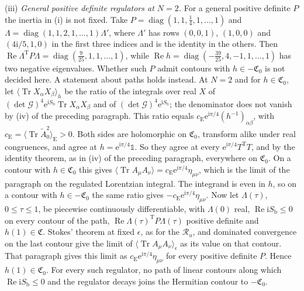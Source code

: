 (iii) \emph{General positive definite regulators at \(N=2\).} For a general positive definite \(P\) the inertia in (i) is not fixed. Take \(P=\operatorname{diag}(1,1,\tfrac14,1,\dots,1)\) and \(\Lambda=\operatorname{diag}(1,1,2,1,\dots,1)\Lambda'\), where \(\Lambda'\) has rows \((0,0,1)\), \((1,0,0)\) and \((4\mathrm i/5,1,0)\) in the first three indices and is the identity in the others. Then \(\operatorname{Re}\Lambda^{\mathrm T}P\Lambda=\operatorname{diag}(\tfrac9{25},1,1,\dots,1)\), while \(\operatorname{Re}h=\operatorname{diag}(-\tfrac{39}{25},4,-1,1,\dots,1)\) has two negative eigenvalues. Whether such \(P\) admit contours with \(h\in-\mathfrak C_0\) is not decided here. A statement about paths holds instead. At \(N=2\) and for \(h\in\mathfrak C_0\), let \(\langle\operatorname{Tr}X_\alpha X_\beta\rangle_h\) be the ratio of the integrals over real \(X\) of \((\det\mathcal G)^4\mathrm e^{\mathrm iS_{\mathrm b}}\operatorname{Tr}X_\alpha X_\beta\) and of \((\det\mathcal G)^4\mathrm e^{\mathrm iS_{\mathrm b}}\); the denominator does not vanish by (iv) of the preceding paragraph. This ratio equals \(c_{\mathrm E}\mathrm e^{\mathrm i\pi/4}(h^{-1})_{\alpha\beta}\), with \(c_{\mathrm E}=\langle\operatorname{Tr}\tilde A_0^2\rangle_{\mathrm E}>0\). Both sides are holomorphic on \(\mathfrak C_0\), transform alike under real congruences, and agree at \(h=\mathrm e^{\mathrm i\pi/4}\mathbb 1\). So they agree at every \(\mathrm e^{\mathrm i\pi/4}T^{\mathrm T}T\), and by the identity theorem, as in (iv) of the preceding paragraph, everywhere on \(\mathfrak C_0\). On a contour with \(h\in\mathfrak C_0\) this gives \(\langle\operatorname{Tr}A_\mu A_\nu\rangle=c_{\mathrm E}\mathrm e^{\mathrm i\pi/4}\eta_{\mu\nu}\), which is the limit of the paragraph on the regulated Lorentzian integral. The integrand is even in \(h\), so on a contour with \(h\in-\mathfrak C_0\) the same ratio gives \(-c_{\mathrm E}\mathrm e^{\mathrm i\pi/4}\eta_{\mu\nu}\). Now let \(\Lambda(\tau)\), \(0\le\tau\le1\), be piecewise continuously differentiable, with \(\Lambda(0)\) real, \(\operatorname{Re}\mathrm iS_{\mathrm b}\le0\) on every contour of the path, \(\operatorname{Re}\Lambda(\tau)^{\mathrm T}P\Lambda(\tau)\) positive definite and \(h(1)\in\mathfrak C\). Stokes' theorem at fixed \(\epsilon\), as for the \(\mathcal R_u\), and dominated convergence on the last contour give the limit of \(\langle\operatorname{Tr}A_\mu A_\nu\rangle_\epsilon\) as its value on that contour. That paragraph gives this limit as \(c_{\mathrm E}\mathrm e^{\mathrm i\pi/4}\eta_{\mu\nu}\) for every positive definite \(P\). Hence \(h(1)\in\mathfrak C_0\). For every such regulator, no path of linear contours along which \(\operatorname{Re}\mathrm iS_{\mathrm b}\le0\) and the regulator decays joins the Hermitian contour to \(-\mathfrak C_0\).

